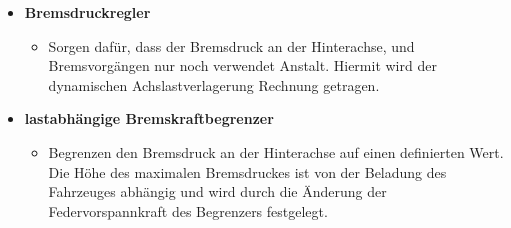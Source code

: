 \begin{itemize}
\item
  \textbf{Bremsdruckregler}

  \begin{itemize}
  \item
    Sorgen dafür, dass der Bremsdruck an der Hinterachse, und
    Bremsvorgängen nur noch verwendet Anstalt. Hiermit wird der
    dynamischen Achslastverlagerung Rechnung getragen.
  \end{itemize}
\item
  \textbf{lastabhängige Bremskraftbegrenzer}

  \begin{itemize}
  \item
    Begrenzen den Bremsdruck an der Hinterachse auf einen definierten
    Wert. Die Höhe des maximalen Bremsdruckes ist von der Beladung des
    Fahrzeuges abhängig und wird durch die Änderung der
    Federvorspannkraft des Begrenzers festgelegt.
  \end{itemize}
\end{itemize}
